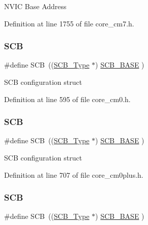 N\+V\+IC Base Address 

Definition at line 1755 of file core\+\_\+cm7.\+h.

\mbox{\label{group___c_m_s_i_s__core__base_gaaaf6477c2bde2f00f99e3c2fd1060b01}} 
\subsubsection{\texorpdfstring{S\+CB}{SCB}\hspace{0.1cm}{\footnotesize\ttfamily [1/7]}}
{\footnotesize\ttfamily \#define S\+CB~((\hyperlink{struct_s_c_b___type}{S\+C\+B\+\_\+\+Type}       $\ast$)     \hyperlink{group___c_m_s_i_s__core__base_gad55a7ddb8d4b2398b0c1cfec76c0d9fd}{S\+C\+B\+\_\+\+B\+A\+SE}      )}

S\+CB configuration struct 

Definition at line 595 of file core\+\_\+cm0.\+h.

\mbox{\label{group___c_m_s_i_s__core__base_gaaaf6477c2bde2f00f99e3c2fd1060b01}} 
\subsubsection{\texorpdfstring{S\+CB}{SCB}\hspace{0.1cm}{\footnotesize\ttfamily [2/7]}}
{\footnotesize\ttfamily \#define S\+CB~((\hyperlink{struct_s_c_b___type}{S\+C\+B\+\_\+\+Type}       $\ast$)     \hyperlink{group___c_m_s_i_s__core__base_gad55a7ddb8d4b2398b0c1cfec76c0d9fd}{S\+C\+B\+\_\+\+B\+A\+SE}      )}

S\+CB configuration struct 

Definition at line 707 of file core\+\_\+cm0plus.\+h.

\mbox{\label{group___c_m_s_i_s__core__base_gaaaf6477c2bde2f00f99e3c2fd1060b01}} 
\subsubsection{\texorpdfstring{S\+CB}{SCB}\hspace{0.1cm}{\footnotesize\ttfamily [3/7]}}
{\footnotesize\ttfamily \#define S\+CB~((\hyperlink{struct_s_c_b___type}{S\+C\+B\+\_\+\+Type}       $\ast$)     \hyperlink{group___c_m_s_i_s__core__base_gad55a7ddb8d4b2398b0c1cfec76c0d9fd}{S\+C\+B\+\_\+\+B\+A\+SE}      )}

